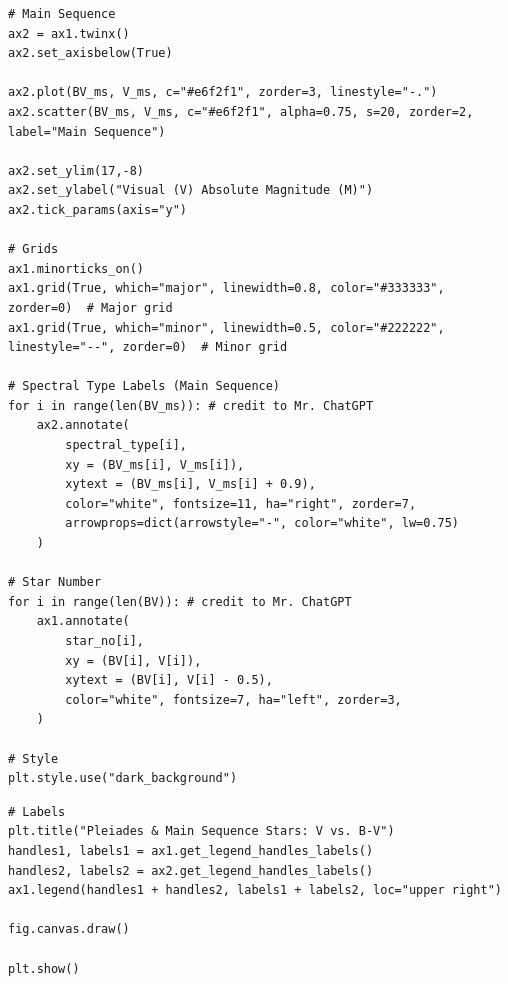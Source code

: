 \documentclass[12pt]{article}
\begin{document}
\begin{minipage}{\linewidth}
\captionsetup{hypcap=false}

\begin{mintedbox}
\begin{verbatim}
# Main Sequence
ax2 = ax1.twinx()
ax2.set_axisbelow(True)

ax2.plot(BV_ms, V_ms, c="#e6f2f1", zorder=3, linestyle="-.")
ax2.scatter(BV_ms, V_ms, c="#e6f2f1", alpha=0.75, s=20, zorder=2, label="Main Sequence")

ax2.set_ylim(17,-8)
ax2.set_ylabel("Visual (V) Absolute Magnitude (M)")
ax2.tick_params(axis="y")

# Grids
ax1.minorticks_on()
ax1.grid(True, which="major", linewidth=0.8, color="#333333", zorder=0)  # Major grid
ax1.grid(True, which="minor", linewidth=0.5, color="#222222", linestyle="--", zorder=0)  # Minor grid

# Spectral Type Labels (Main Sequence)
for i in range(len(BV_ms)): # credit to Mr. ChatGPT
    ax2.annotate(
        spectral_type[i],
        xy = (BV_ms[i], V_ms[i]),
        xytext = (BV_ms[i], V_ms[i] + 0.9),
        color="white", fontsize=11, ha="right", zorder=7,
        arrowprops=dict(arrowstyle="-", color="white", lw=0.75)
    )

# Star Number
for i in range(len(BV)): # credit to Mr. ChatGPT
    ax1.annotate(
        star_no[i],
        xy = (BV[i], V[i]),
        xytext = (BV[i], V[i] - 0.5),
        color="white", fontsize=7, ha="left", zorder=3,
    )

# Style
plt.style.use("dark_background")

\end{verbatim}
\end{mintedbox}

\end{minipage}

\begin{minipage}{\linewidth}
\captionsetup{hypcap=false}

\begin{mintedbox}
\begin{verbatim}
# Labels
plt.title("Pleiades & Main Sequence Stars: V vs. B-V")
handles1, labels1 = ax1.get_legend_handles_labels()
handles2, labels2 = ax2.get_legend_handles_labels()
ax1.legend(handles1 + handles2, labels1 + labels2, loc="upper right")

fig.canvas.draw()

plt.show()

\end{verbatim}
\end{mintedbox}

\end{minipage}
\end{document}
